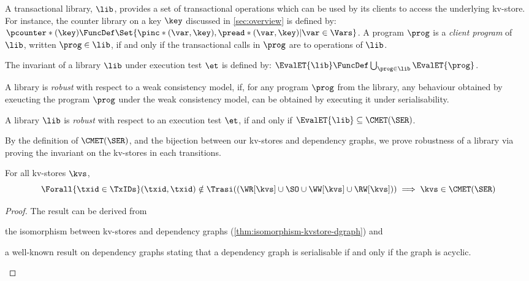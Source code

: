 A transactional library, \(\lib \),
provides a set of transactional operations which can be used by its clients to access the underlying kv-store.
For instance, the counter library on a key \(\key\) discussed in \cref{sec:overview} is defined by:
\(\pcounter*(\key) \FuncDef \Set{\pinc*(\var,\key), \pread*(\var,\key) | \var \in \Vars}\).
A program \(\prog\) is a \emph{client program} of \(\lib\), written \( \prog \in \lib\), 
if and only if the transactional calls in \(\prog\) are to operations of \(\lib\).  

\begin{definition}
The invariant of a library \( \lib\)  under execution test \( \et \) is defined by:
\( \EvalET{\lib} \FuncDef \bigcup_{\prog \in \lib} \EvalET{\prog} \).
\end{definition}

A library is \emph{robust} with respect to a weak consistency model,
if, for any program \( \prog \) from the library,
any behaviour obtained by exeucting the program \( \prog \)  under the weak consistency model,
can be obtained by executing it under serialisability.

\begin{definition}[Robustness]
\label{def:robustness}
A library \( \lib \) is \emph{robust} with respect to an execution test \( \et \), if and only if
\( \EvalET{\lib} \subseteq \CMET(\SER) \).
\end{definition}

By the definition of \( \CMET(\SER) \), and the bijection between our kv-stores and dependency graphs,
we prove robustness of a library via proving the invariant on the kv-stores in each transitions.

\begin{theorem}
\label{thm:serialisable-nocycle}
For all kv-stores \(\kvs\), 
\[ 
    \Forall{\txid \in \TxIDs} (\txid,\txid) \notin \Trasi((\WR[\kvs] \cup \SO \cup \WW[\kvs] \cup \RW[\kvs])) \implies 
    \kvs \in \CMET(\SER)
\]
\end{theorem}
\begin{proof}
The result can be derived from 
\begin{enumerate*} 
\item the isomorphism between kv-stores and dependency graphs (\cref{thm:isomorphism-kvstore-dgraph})
and \item a well-known result on dependency graphs \citep{adya} 
stating that a dependency graph is serialisable if and only if the graph is acyclic.
\end{enumerate*}
\end{proof}

